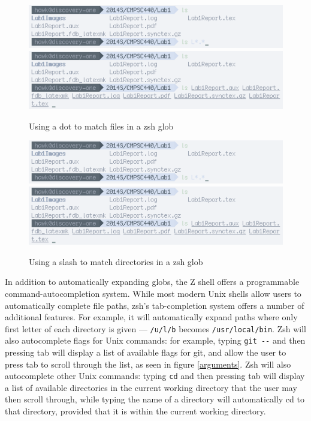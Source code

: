 \documentclass[12pt,a4paper]{article}
\begin{document}
		\begin{figure}[ht!]
			\includegraphics[resolution=72, scale=0.75]{Lab1Images/predot.png}
			\includegraphics[resolution=72, scale=0.75]{Lab1Images/postdot.png}
			\caption{Using a dot to match files in a zsh glob}
			\label{dot}
		\end{figure}


		\begin{figure}[ht!]
			\includegraphics[resolution=72, scale=0.75]{Lab1Images/predot.png}
			\includegraphics[resolution=72, scale=0.75]{Lab1Images/postdot.png}
			\caption{Using a slash to match directories in a zsh glob}
			\label{slash}
		\end{figure}

		In addition to automatically expanding globs, the Z shell offers a programmable command-autocompletion system. While most modern Unix shells allow users to automatically complete file paths, zsh's tab-completion system offers a number of additional features. For example, it will automatically expand paths where only first letter of each directory is given --- \lstinline{/u/l/b} becomes \lstinline{/usr/local/bin}. Zsh will also autocomplete flags for Unix commands: for example, typing \lstinline{git --} and then pressing tab will display a list of available flags for git, and allow the user to press tab to scroll through the list, as seen in figure \ref{arguments}. Zsh will also autocomplete other Unix commands: typing \lstinline{cd} and then pressing tab will display a list of available directories in the current working directory that the user may then scroll through, while typing the name of a directory will automatically cd to that directory, provided that it is within the current working directory.
\end{document}
